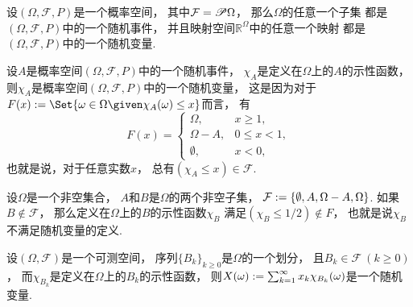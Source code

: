 \begin{example}
设\((\Omega,\mathcal{F},P)\)是一个概率空间，
其中\(\mathcal{F} = \mathscr{P}\Omega\)，
那么\(\Omega\)的任意一个子集
都是\((\Omega,\mathcal{F},P)\)中的一个随机事件，
并且映射空间\(\mathbb{R}^\Omega\)中的任意一个映射
都是\((\Omega,\mathcal{F},P)\)中的一个随机变量.
\end{example}

\begin{example}
设\(A\)是概率空间\((\Omega,\mathcal{F},P)\)中的一个随机事件，
\(\chi_A\)是定义在\(\Omega\)上的\(A\)的示性函数，
则\(\chi_A\)是概率空间\((\Omega,\mathcal{F},P)\)中的一个随机变量，
这是因为对于\(
	F(x)
	\defeq
	\Set{
		\omega \in \Omega
		\given
		\chi_A(\omega) \leq x
	}
\)而言，
有\begin{equation*}
	F(x) = \begin{cases}
		\Omega, & x \geq 1, \\
		\Omega-A, & 0 \leq x < 1, \\
		\emptyset, & x < 0,
	\end{cases}
\end{equation*}
也就是说，对于任意实数\(x\)，
总有\(
	(\chi_A \leq x)
	\in \mathcal{F}
\).
\end{example}

\begin{example}
设\(\Omega\)是一个非空集合，
\(A\)和\(B\)是\(\Omega\)的两个非空子集，
\(\mathcal{F} := \{\emptyset,A,\Omega-A,\Omega\}\).
如果\(B \notin \mathcal{F}\)，
那么定义在\(\Omega\)上的\(B\)的示性函数\(\chi_B\)
满足\((\chi_B \leq 1/2) \notin F\)，
也就是说\(\chi_B\)不满足随机变量的定义.
\end{example}

\begin{example}
设\((\Omega,\mathcal{F})\)是一个可测空间，
序列\(\{B_k\}_{k\geq0}\)是\(\Omega\)的一个划分，
且\(B_k \in \mathcal{F}\ (k\geq0)\)，
而\(\chi_{B_k}\)是定义在\(\Omega\)上的\(B_k\)的示性函数，
则\(
	X(\omega) := \sum_{k=1}^\infty x_k \chi_{B_k}(\omega)
\)是一个随机变量.
\end{example}
